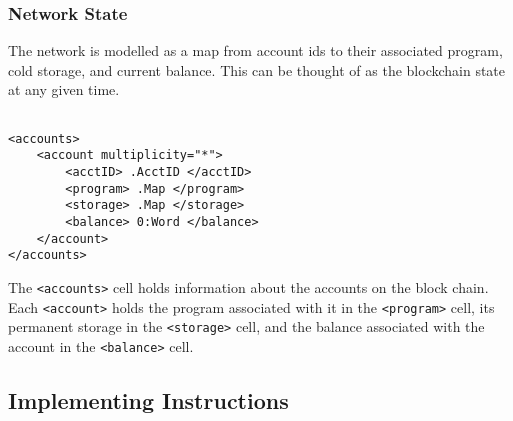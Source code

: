 \subsubsection{Network State}

The network is modelled as a map from account ids to their associated program,
cold storage, and current balance. This can be thought of as the blockchain
state at any given time.

\begin{verbatim}

<accounts>
    <account multiplicity="*">
        <acctID> .AcctID </acctID>
        <program> .Map </program>
        <storage> .Map </storage>
        <balance> 0:Word </balance>
    </account>
</accounts>

\end{verbatim}

The \texttt{<accounts>} cell holds information about the accounts on the block
chain. Each \texttt{<account>} holds the program associated with it in the
\texttt{<program>} cell, its permanent storage in the \texttt{<storage>} cell,
and the balance associated with the account in the \texttt{<balance>} cell.

\subsection{Implementing Instructions}

